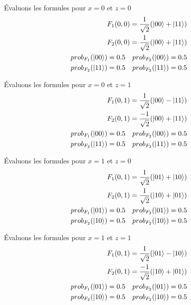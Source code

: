 \documentclass{article}
\begin{document}
Évaluons les formules pour $x = 0$ et $z = 0$ \\
\begin{align*}
    F_1(0,0)=\frac{1}{\sqrt{2}}(\ket{00} + \ket{11}) \\
    F_2(0,0)=\frac{1}{\sqrt{2}}(\ket{00} + \ket{11}) \\
    prob_{F_1}(\ket{00}) = 0.5 \quad prob_{F_2}(\ket{00}) = 0.5 \\
    prob_{F_2}(\ket{11}) = 0.5 \quad prob_{F_2}(\ket{11}) = 0.5 \\
\end{align*}

Évaluons les formules pour $x = 0$ et $z = 1$ \\
\begin{align*}
    F_1(0,1)=\frac{1}{\sqrt{2}}(\ket{00} - \ket{11}) \\
    F_2(0,1)=\frac{-1}{\sqrt{2}}(\ket{00} + \ket{11}) \\
    prob_{F_1}(\ket{00}) = 0.5 \quad prob_{F_2}(\ket{00}) = 0.5 \\
    prob_{F_2}(\ket{11}) = 0.5 \quad prob_{F_2}(\ket{11}) = 0.5 \\
\end{align*}

Évaluons les formules pour $x = 1$ et $z = 0$ \\
\begin{align*}
    F_1(0,1)=\frac{1}{\sqrt{2}}(\ket{01} + \ket{10}) \\
    F_2(0,1)=\frac{1}{\sqrt{2}}(\ket{10} + \ket{01}) \\
    prob_{F_1}(\ket{01}) = 0.5 \quad prob_{F_2}(\ket{01}) = 0.5 \\
    prob_{F_2}(\ket{10}) = 0.5 \quad prob_{F_2}(\ket{10}) = 0.5 \\
\end{align*}

Évaluons les formules pour $x = 1$ et $z = 1$ \\
\begin{align*}
    F_1(0,1)=\frac{1}{\sqrt{2}}(\ket{01} - \ket{10}) \\
    F_2(0,1)=\frac{-1}{\sqrt{2}}(\ket{10} + \ket{01}) \\
    prob_{F_1}(\ket{01}) = 0.5 \quad prob_{F_2}(\ket{01}) = 0.5 \\
    prob_{F_2}(\ket{10}) = 0.5 \quad prob_{F_2}(\ket{10}) = 0.5 \\
\end{align*}
\end{document}
